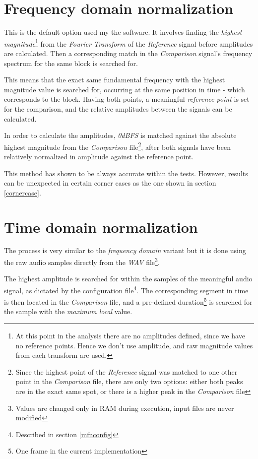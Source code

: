 \documentclass[10pt,a4paper]{report}
\begin{document}
\begin{appendices}
\section{Frequency domain normalization}

This is the default option used my the software. It involves finding the \textit{highest magnitude}\footnote{At this point in the analysis there are no amplitudes defined, since we have no reference points. Hence we don't use amplitude, and raw magnitude values from each transform are used.} from the \textit{Fourier Transform} of the \textit{Reference} signal before amplitudes are calculated. Then a corresponding match in the \textit{Comparison} signal's frequency spectrum for the same block is searched for. 

This means that the exact same fundamental frequency with the highest magnitude value is searched for, occurring at the same position in time - which corresponds to the block. Having both points, a meaningful \textit{reference point} is set for the comparison, and the relative amplitudes between the signals can be calculated.

In order to calculate the amplitudes, \textit{0dBFS} is matched against the absolute highest magnitude from the \textit{Comparison} file\footnote{Since the highest point of the \textit{Reference} signal was matched to one other point in the \textit{Comparison} file, there are only two options: either both peaks are in the exact same spot, or there is a higher peak in the \textit{Comparison} file}, after both signals have been relatively normalized in amplitude against the reference point.

This method has shown to be always accurate within the tests. However, results can be unexpected in certain corner cases as the one shown in section \ref{cornercase}. 

\section{Time domain normalization}

The process is very similar to the \textit{frequency domain} variant but it is done using the raw audio samples directly from the \textit{WAV} file\footnote{Values are changed only in RAM during execution, input files are never modified}.

The highest amplitude is searched for within the samples of the meaningful audio signal, as dictated by the configuration file\footnote{Described in section \ref{mfnconfig}}. The corresponding segment in time is then located in the \textit{Comparison} file, and a pre-defined duration\footnote{One frame in the current implementation} is searched for the sample with the \textit{maximum local} value.


\end{appendices}
\end{document}
